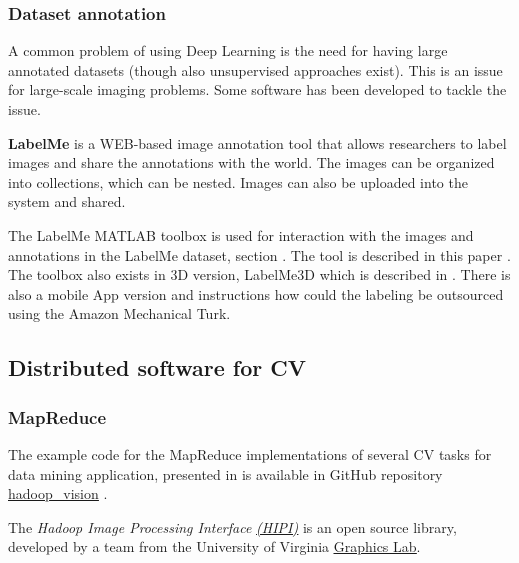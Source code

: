 {\subsubsection{Dataset annotation}\label{subsec:dbannot}
A common problem of using Deep Learning is the need for having large annotated datasets (though also unsupervised approaches exist). This is an issue for large-scale imaging problems. Some software has been developed to tackle the issue.

{\bf LabelMe} is a WEB-based image annotation tool that allows researchers to label images and share the annotations with the world. The images can be organized into collections, which can be nested. Images can also be uploaded into the system and shared.

The LabelMe MATLAB toolbox is used for interaction with the images and annotations in the LabelMe dataset, section . The tool is described in this paper
\cite{Russell2008}. The toolbox also exists in 3D version, LabelMe3D which is described in \cite{Russell2009}. There is also a mobile App version and instructions how could the labeling be outsourced using the Amazon Mechanical Turk.

\subsection{Distributed software for CV}\label{subsec:largescalesoft}

\subsubsection{MapReduce}\label{subsubsec:MapReduce}
The example code for the MapReduce implementations of several CV tasks for data mining application, presented in \cite{White:2010} is available in  GitHub repository \href{https://github.com/bwhite/hadoop_vision}{\underline{hadoop\_vision}} \cite{hadoopvision_soft}.

The {\em Hadoop Image Processing Interface} \href{http://hipi.cs.virginia.edu}{\em \underline{(HIPI)}} \cite{hipi_soft} is an open source library, developed by a team from the University of Virginia \href{http://www.cs.virginia.edu/~gfx/pmwiki/index.php}{\underline{Graphics Lab}}.

}
